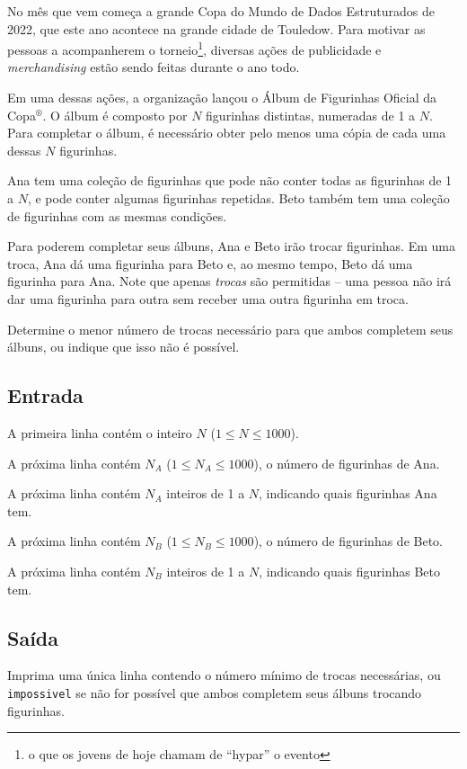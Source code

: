 No mês que vem começa a grande Copa do Mundo de Dados Estruturados de 2022, que
este ano acontece na grande cidade de Touledow. Para motivar as pessoas a
acompanherem o torneio\footnote{o que os jovens de hoje chamam de ``hypar'' o
evento}, diversas ações de publicidade e \textit{merchandising}
estão sendo feitas durante o ano todo.

Em uma dessas ações, a organização lançou o Álbum de Figurinhas Oficial da
Copa$^\circledR$. O álbum é composto por $N$ figurinhas distintas, numeradas de
1 a $N$. Para completar o álbum, é necessário obter pelo menos uma cópia de cada
uma dessas $N$ figurinhas.

Ana tem uma coleção de figurinhas que pode não conter todas as figurinhas de 1
a $N$, e pode conter algumas figurinhas repetidas. Beto também tem uma coleção
de figurinhas com as mesmas condições.

Para poderem completar seus álbuns, Ana e Beto irão trocar figurinhas.
Em uma troca, Ana dá uma figurinha para Beto e, ao mesmo tempo,
Beto dá uma figurinha para Ana. Note que apenas \textit{trocas} são
permitidas -- uma pessoa não irá dar uma figurinha para outra sem receber uma
outra figurinha em troca.

Determine o menor número de trocas necessário para que ambos completem seus
álbuns, ou indique que isso não é possível.

\subsection*{Entrada}

A primeira linha contém o inteiro $N$ ($1 \leq N \leq 1000$).

A próxima linha
contém $N_A$ ($1 \leq N_A \leq 1000$), o número de figurinhas de Ana.

A próxima
linha contém $N_A$ inteiros de 1 a $N$, indicando quais figurinhas Ana tem.

A próxima linha
contém $N_B$ ($1 \leq N_B \leq 1000$), o número de figurinhas de Beto.

A próxima
linha contém $N_B$ inteiros de 1 a $N$, indicando quais figurinhas Beto tem.

\subsection*{Saída}

Imprima uma única linha contendo o número mínimo de trocas necessárias, ou
\verb|impossivel| se não for possível que ambos completem seus álbuns trocando
figurinhas.

